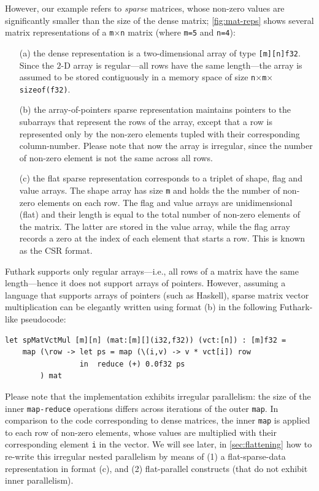 \documentclass[acmsmall,review]{acmart}\settopmatter{printfolios=true,printccs=false,printacmref=false}
\begin{document}
However, our example refers to {\em sparse} matrices, whose non-zero
values are significantly smaller than the size of the dense matrix;
\cref{fig:mat-reps} shows several matrix representations
of a {\tt m$\times$n} matrix (where {\tt m=5} and {\tt n=4}):
\begin{itemize}
    \item[(a)] the dense representation is a two-dimensional
        array of type \lstinline{[m][n]f32}. Since the $2$-D array
        is regular---all rows have the same length---the array is 
        assumed to be stored contiguously in a memory space of
        size {\tt n$\times$m$\times$sizeof(f32)}.
    \item[(b)] the array-of-pointers sparse representation maintains
        pointers to the subarrays that represent the rows of the array,
        except that a row is represented only by the non-zero elements
        tupled with their corresponding column-number. Please note
        that now the array is irregular, since the number of non-zero
        element is not the same across all rows. 
    \item[(c)] the flat sparse representation corresponds to a triplet
        of shape, flag and value arrays. The shape array has size {\tt m}
        and holds the the number of non-zero elements on each row. The
        flag and value arrays are unidimensional (flat) and their length
        is equal to the total number of non-zero elements of the matrix.
        The latter are stored in the value array, while the flag array
        records a zero at the index of each element that starts a row.
        This is known as the CSR format.
\end{itemize}

Futhark supports only regular arrays---i.e., all rows of a matrix have 
the same length---hence it does not support arrays of pointers. 
However, assuming a language that supports arrays of pointers 
(such as Haskell), sparse matrix vector multiplication can be 
elegantly written using format (b) in the following Futhark-like 
pseudocode:\medskip

\begin{lstlisting}[mathescape=true]
let spMatVctMul [m][n] (mat:[m][](i32,f32)) (vct:[n]) : [m]f32 =
    map (\row -> let ps = map (\(i,v) -> v * vct[i]) row
                 in  reduce (+) 0.0f32 ps 
        ) mat
\end{lstlisting}\vspace{-2ex} 
Please note that the implementation exhibits irregular parallelism:
the size of the inner \lstinline{map-reduce} operations differs 
across iterations of the outer \lstinline{map}. In comparison to
the code corresponding to dense matrices, the inner \lstinline{map} 
is applied to each row of non-zero elements, whose values are multiplied 
with their corresponding element {\tt i} in the vector.
%
We will see later, in \cref{sec:flattening} how to re-write this 
irregular nested parallelism by means of (1) a flat-sparse-data 
representation in format (c), and (2) flat-parallel constructs 
(that do not exhibit inner parallelism).\bigskip
\end{document}
